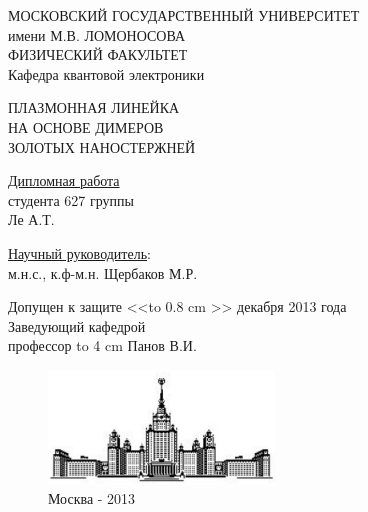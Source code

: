 \begin{titlepage}
\begin{center}
{\Large

МОСКОВСКИЙ ГОСУДАРСТВЕННЫЙ УНИВЕРСИТЕТ\\
имени М.В. ЛОМОНОСОВА\\
ФИЗИЧЕСКИЙ ФАКУЛЬТЕТ\\
Кафедра квантовой электроники

\vspace{5cm}

ПЛАЗМОННАЯ ЛИНЕЙКА \\
НА ОСНОВЕ ДИМЕРОВ \\
ЗОЛОТЫХ НАНОСТЕРЖНЕЙ

}
\end{center}


\vspace{1cm}
\begin{flushright}
\underline{Дипломная работа}\\
студента 627 группы\\
Ле А.Т.

\vspace{1cm}

\underline{Научный руководитель}:\\
м.н.с., к.ф-м.н. Щербаков М.Р.\\
\end{flushright}

\begin{flushleft}
Допущен к защите <<\hbox to 0.8 cm {\hrulefill}>> декабря 2013 года\\
Заведующий кафедрой\\
\vspace{0.3 cm}
профессор \hbox to 4 cm {\hrulefill Панов В.И.}
\end{flushleft}

\vspace{1cm}
\begin{figure}[b]
\centering
\includegraphics[width=60mm]{img/msu.jpg}\\
Москва - 2013
\end{figure}

\end{titlepage}